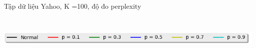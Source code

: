 \documentclass[pdf]{beamer}
\begin{document}
\begin{frame}{Tập dữ liệu Yahoo, K =100, độ đo perplexity}
	\begin{columns}[T] %
		\begin{column}{.50\textwidth}
		\begin{figure}
		\end{figure}
		\end{column} %
		\hfill%
		\begin{column}{.50\textwidth}
			\begin{figure}
			\end{figure}				
		\end{column} %
	\end{columns}
\begin{center}
	\includegraphics[width=1\textwidth]{menu.png}	
\end{center}
\end{frame}
\end{document}
